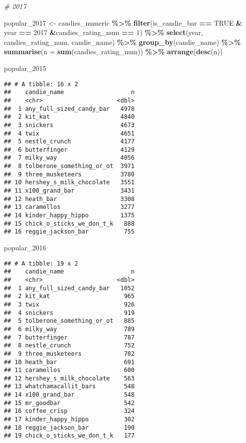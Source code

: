 \documentclass[
]{article}
\newenvironment{Shaded}{\begin{snugshade}}{\end{snugshade}}
\newcommand{\AttributeTok}[1]{\textcolor[rgb]{0.13,0.29,0.53}{#1}}
\newcommand{\CommentTok}[1]{\textcolor[rgb]{0.56,0.35,0.01}{\textit{#1}}}
\newcommand{\ConstantTok}[1]{\textcolor[rgb]{0.56,0.35,0.01}{#1}}
\newcommand{\DecValTok}[1]{\textcolor[rgb]{0.00,0.00,0.81}{#1}}
\newcommand{\FunctionTok}[1]{\textcolor[rgb]{0.13,0.29,0.53}{\textbf{#1}}}
\newcommand{\NormalTok}[1]{#1}
\newcommand{\OtherTok}[1]{\textcolor[rgb]{0.56,0.35,0.01}{#1}}
\newcommand{\SpecialCharTok}[1]{\textcolor[rgb]{0.81,0.36,0.00}{\textbf{#1}}}
\begin{document}
\begin{Shaded}
\begin{Highlighting}[]
\CommentTok{\# 2017}

\NormalTok{popular\_2017 }\OtherTok{\textless{}{-}}\NormalTok{ candies\_numeric }\SpecialCharTok{\%\textgreater{}\%} 
  \FunctionTok{filter}\NormalTok{(is\_candie\_bar }\SpecialCharTok{==} \ConstantTok{TRUE} \SpecialCharTok{\&}\NormalTok{ year }\SpecialCharTok{==} \DecValTok{2017} \SpecialCharTok{\&}\NormalTok{candies\_rating\_num }\SpecialCharTok{==} \DecValTok{1}\NormalTok{) }\SpecialCharTok{\%\textgreater{}\%}
  \FunctionTok{select}\NormalTok{(year, candies\_rating\_num, candie\_name) }\SpecialCharTok{\%\textgreater{}\%}
  \FunctionTok{group\_by}\NormalTok{(candie\_name) }\SpecialCharTok{\%\textgreater{}\%} 
  \FunctionTok{summarise}\NormalTok{(}\AttributeTok{n =} \FunctionTok{sum}\NormalTok{(candies\_rating\_num)) }\SpecialCharTok{\%\textgreater{}\%} 
  \FunctionTok{arrange}\NormalTok{(}\FunctionTok{desc}\NormalTok{(n))}


\NormalTok{popular\_2015}
\end{Highlighting}
\end{Shaded}

\begin{verbatim}
## # A tibble: 16 x 2
##    candie_name                   n
##    <chr>                     <dbl>
##  1 any_full_sized_candy_bar   4978
##  2 kit_kat                    4840
##  3 snickers                   4673
##  4 twix                       4651
##  5 nestle_crunch              4177
##  6 butterfinger               4129
##  7 milky_way                  4056
##  8 tolberone_something_or_ot  3971
##  9 three_musketeers           3780
## 10 hershey_s_milk_chocolate   3551
## 11 x100_grand_bar             3431
## 12 heath_bar                  3308
## 13 caramellos                 3277
## 14 kinder_happy_hippo         1375
## 15 chick_o_sticks_we_don_t_k   888
## 16 reggie_jackson_bar          755
\end{verbatim}

\begin{Shaded}
\begin{Highlighting}[]
\NormalTok{popular\_2016}
\end{Highlighting}
\end{Shaded}

\begin{verbatim}
## # A tibble: 19 x 2
##    candie_name                   n
##    <chr>                     <dbl>
##  1 any_full_sized_candy_bar   1052
##  2 kit_kat                     965
##  3 twix                        926
##  4 snickers                    919
##  5 tolberone_something_or_ot   885
##  6 milky_way                   789
##  7 butterfinger                787
##  8 nestle_crunch               752
##  9 three_musketeers            702
## 10 heath_bar                   691
## 11 caramellos                  600
## 12 hershey_s_milk_chocolate    563
## 13 whatchamacallit_bars        548
## 14 x100_grand_bar              548
## 15 mr_goodbar                  542
## 16 coffee_crisp                324
## 17 kinder_happy_hippo          302
## 18 reggie_jackson_bar          190
## 19 chick_o_sticks_we_don_t_k   177
\end{verbatim}
\end{document}
